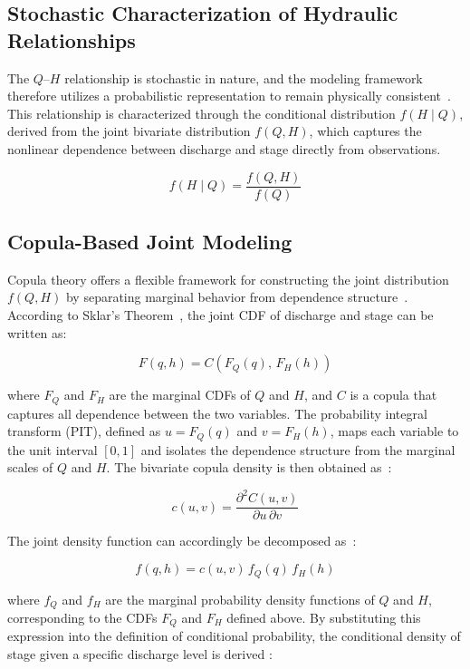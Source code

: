 \documentclass[11pt]{article}
\begin{document}
\subsection{Stochastic Characterization of Hydraulic Relationships}
The $Q$--$H$ relationship is stochastic in nature, and the modeling framework therefore utilizes a probabilistic representation to remain physically consistent~\cite{Bulygina2011, Bulygina2010}. This relationship is characterized through the conditional distribution $f(H \mid Q)$, derived from the joint bivariate distribution $f(Q, H)$, which captures the nonlinear dependence between discharge and stage directly from observations. 

\begin{equation}
    f(H \mid Q) = \frac{f(Q, H)}{f(Q)}
\end{equation}

\subsection{Copula-Based Joint Modeling}
Copula theory offers a flexible framework for constructing the joint distribution $f(Q,H)$ by separating marginal behavior from dependence structure~\cite{Joe2014}. According to Sklar's Theorem~\cite{Sklar1959}, the joint CDF of discharge and stage can be written as:

\begin{equation}
    F(q,h) = C\!\left(F_Q(q),\,F_H(h)\right)
\end{equation}

where $F_Q$ and $F_H$ are the marginal CDFs of $Q$ and $H$, and $C$ is a copula that captures all dependence between the two variables. The probability integral transform (PIT), defined as $u=F_Q(q)$ and $v=F_H(h)$, maps each variable to the unit interval $[0,1]$ and isolates the dependence structure  from the marginal scales of $Q$ and $H$. The bivariate copula  density is then obtained as~\cite{Sadegh2018}: 

\begin{equation}
    c(u, v) = \frac{\partial^2 C(u, v)}{\partial u \, \partial v}
\end{equation}

The joint density function can accordingly be decomposed as~\cite{Madadgar2013}:

\begin{equation}
    f(q, h) = c(u, v)\, f_Q(q)\, f_H(h)
\end{equation}

where $f_Q$ and $f_H$ are the marginal probability density functions of $Q$ and $H$, corresponding to the CDFs $F_Q$ and $F_H$ defined above. By substituting this expression into the definition of conditional probability, the conditional density of stage given a specific discharge level is derived 
\cite{Madadgar2013, Mazdiyasni2017}:
\end{document}
